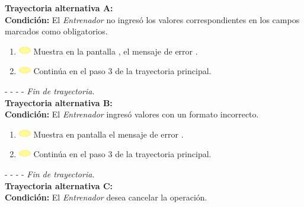 
\textbf{\large{Trayectoria alternativa A:}}\\
\textbf{Condición: } El \textit{Entrenador} no ingresó los valores correspondientes  en los campos marcados como obligatorios.

\begin{enumerate}
	\item \includegraphics[width=15pt]{./Figuras/iconosCU/herramienta.png} Muestra en la pantalla , el mensaje de error .
	\item \includegraphics[width=15pt]{./Figuras/iconosCU/herramienta.png} Continúa en el paso 3 de la trayectoria principal.
\end{enumerate}

- - - - \textit{Fin de trayectoria.} \\

\textbf{\large{Trayectoria alternativa B:}}\\
\textbf{Condición: } El \textit{Entrenador} ingresó valores con un formato incorrecto.

\begin{enumerate}
	\item \includegraphics[width=15pt]{./Figuras/iconosCU/herramienta.png} Muestra en 
	pantalla el mensaje de error .
	\item \includegraphics[width=15pt]{./Figuras/iconosCU/herramienta.png} Continúa en el paso 3 de la trayectoria principal.
\end{enumerate}

- - - - \textit{Fin de trayectoria.} \\

\textbf{\large{Trayectoria alternativa C:}}\\
\textbf{Condición: } El \textit{Entrenador} desea cancelar la operación.


